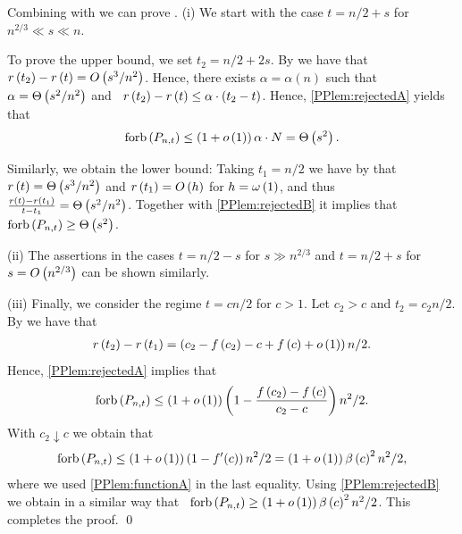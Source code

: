 Combining  with  we can prove .
(i) We start with the case $t=n/2+s$ for $n^{2/3}\ll s\ll n$. 

To prove the upper bound, we set $t_2=n/2+2s$. By  we have that \whp\ $r\left(t_2\right)-r\left(t\right)=O\left(s^3/n^2\right)$. Hence, there exists $\alpha=\alpha(n)$ such that $\alpha=\Theta\left(s^2/n^2\right)$ and \whp\ $r\left(t_2\right)-r\left(t\right)\leq \alpha \cdot \left(t_2-t\right)$. Hence, \ref{PPlem:rejectedA} yields that \whp\ 
\begin{align*}
\operatorname{forb}\left(P_{n,t}\right)\leq \left(1+o\left(1\right)\right)\alpha\cdot N=\Theta\left(s^2\right).
\end{align*}

Similarly, we obtain the lower bound: Taking $t_1=n/2$ we have by  that \whp\ $r\left(t\right)=\Theta\left(s^3/n^2\right)$ and $r\left(t_1\right)=O\left(h\right)$ for $h=\omega\left(1\right)$, and thus $\frac{r\left(t\right)-r\left(t_1\right)}{t-t_1}=\Theta\left(s^2/n^2\right)$. Together with \ref{PPlem:rejectedB} it implies that \whp\ $\operatorname{forb}\left(P_{n,t}\right)\geq \Theta\left(s^2\right)$. 

(ii) The assertions in the cases $t=n/2-s$ for $s\gg n^{2/3}$ and $t=n/2+s$ for $s=O\left(n^{2/3}\right)$ can be shown similarly.

(iii) Finally, we consider the regime $t=cn/2$ for $c>1$. Let $c_2>c$ and $t_2=c_2n/2$. By  we have that \whp\
\begin{align*}
r\left(t_2\right)-r\left(t_1\right)=\left(c_2-f\left(c_2\right)-c+f\left(c\right)+o\left(1\right)\right)n/2.
\end{align*}
Hence, \Cref{PPlem:rejected}\ref{PPlem:rejectedA} implies that \whp\ 
\begin{align*}
\operatorname{forb}\left(P_{n,t}\right)\leq \left(1+o\left(1\right)\right)\left(1-\frac{f\left(c_2\right)-f\left(c\right)}{c_2-c}\right)n^2/2.
\end{align*}
With $c_2\downarrow c$ we obtain that \whp
\begin{align*}
\operatorname{forb}\left(P_{n,t}\right)\leq\left(1+o\left(1\right)\right)\left(1-f'(c)\right)n^2/2=\left(1+o\left(1\right)\right)\beta\left(c\right)^2n^2/2,
\end{align*}
where we used \ref{PPlem:functionA} in the last equality. Using \ref{PPlem:rejectedB} we obtain in a similar way that \whp\ $\operatorname{forb}\left(P_{n,t}\right)\geq\left(1+o\left(1\right)\right)\beta\left(c\right)^2n^2/2$. This completes the proof.
\qed

